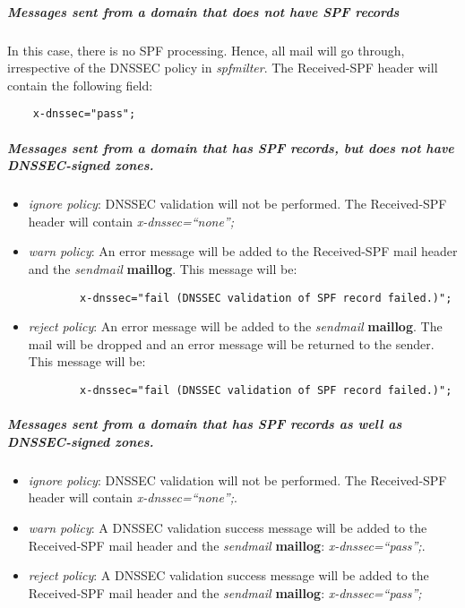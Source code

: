 \documentclass[12pt]{article}
\newcommand{\cmd}[1]{{\em #1}}
\newcommand{\path}[1]{{\bf #1}}
\begin{document}
\subparagraph{Messages sent from a domain that does not have SPF records}

In this case, there is no SPF processing.  Hence, all mail will go through,
irrespective of the DNSSEC policy in \cmd{spfmilter}.  The Received-SPF header
will contain the following field:
\begin{verbatim}
    x-dnssec="pass";
\end{verbatim}

\subparagraph{Messages sent from a domain that has SPF records, but does not have DNSSEC-signed zones.}

\begin{itemize}
\item {\it ignore policy}:  DNSSEC validation will not be performed.
The Received-SPF header will contain {\it x-dnssec=``none'';}

\item {\it warn policy}:  An error message will be added to the Received-SPF
mail header and the \cmd{sendmail} \path{maillog}.
This message will be:
\begin{verbatim}
        x-dnssec="fail (DNSSEC validation of SPF record failed.)";
\end{verbatim}

\item {\it reject policy}:  An error message will be added to the
\cmd{sendmail} \path{maillog}.  The mail will be dropped and an error
message will be returned to the sender.  This message will be:
\begin{verbatim}
        x-dnssec="fail (DNSSEC validation of SPF record failed.)";
\end{verbatim}
\end{itemize}

\subparagraph{Messages sent from a domain that has SPF records as well as DNSSEC-signed zones.}

\begin{itemize}
\item {\it ignore policy}:  DNSSEC validation will not be performed.  The
Received-SPF header will contain {\it x-dnssec=``none'';}.

\item {\it warn policy}:  A DNSSEC validation success message will be added
to the Received-SPF mail header and the \cmd{sendmail} \path{maillog}:
{\it x-dnssec=``pass'';}.

\item {\it reject policy}:  A DNSSEC validation success message will be added
to the Received-SPF mail header and the \cmd{sendmail} \path{maillog}:
{\it x-dnssec=``pass'';}

\end{itemize}
\end{document}
